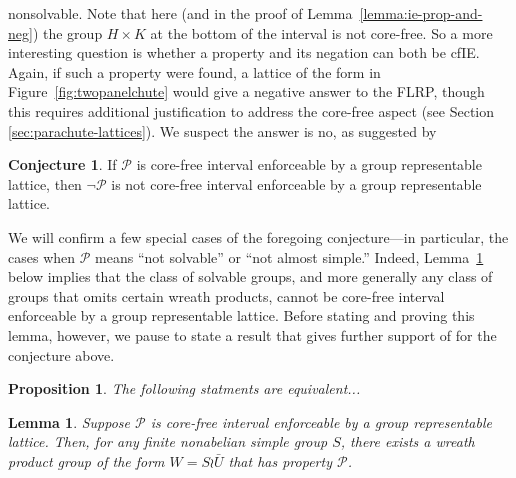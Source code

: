 \documentclass{gen-j-l}
\newcommand{\<}{\ensuremath{\langle}}
\renewcommand{\>}{\ensuremath{\rangle}}
\theoremstyle{plain}
\newtheorem{lemma}[theorem]{Lemma}
\newtheorem{prop}[theorem]{Proposition}
\theoremstyle{definition}
\newcounter{conjecture}
\newtheorem{conjecture}[conjecture]{Conjecture}
\theoremstyle{remark}
\numberwithin{theorem}{section}
\numberwithin{claim}{section}
\numberwithin{equation}{section}
\numberwithin{conjecture}{section}
\newcommand{\2}{\ensuremath{\mathbf{2}}}
\newcommand{\3}{\ensuremath{\mathbf{3}}}
\newcommand{\cP}{\ensuremath{\mathcal{P}}}
\begin{document}
nonsolvable.  Note that here (and in the proof 
of Lemma~\ref{lemma:ie-prop-and-neg}) the group $H\times K$ at the bottom of
the interval is not core-free.  So a more interesting question is whether a
property and its negation can both be \acs{cfIE}.  Again, if such a property were
found, a lattice of the form in Figure~\ref{fig:twopanelchute} would give a
negative answer to the \acs{FLRP}, though this requires additional justification to address
the core-free aspect (see Section \ref{sec:parachute-lattices}).  
We suspect the answer is no, as suggested by
\begin{conjecture}
\label{conjecture:isle-prop2}
If $\cP$ is core-free interval enforceable by a group representable lattice,
then $\neg \cP$ is not core-free interval enforceable by a group representable lattice.
\end{conjecture}

We will confirm a few special cases of the foregoing conjecture---in particular, the cases
when $\cP$ means ``not solvable'' or ``not almost simple.'' Indeed, 
Lemma~\ref{lem:IE-must-have-wreaths} below implies that the class of solvable
groups, and more generally any class of groups that omits certain wreath
products, cannot be core-free interval enforceable by a group representable
lattice. Before stating and proving this lemma, however, we pause to state a
result that gives further support of for the conjecture above.

\begin{prop}
  The following statments are equivalent...
\end{prop}

\begin{lemma}
  \label{lem:IE-must-have-wreaths}
Suppose $\cP$ is core-free interval enforceable by a group
representable lattice.   
Then, for any finite nonabelian simple group $S$, there exists a wreath product group
of the form $W = S\wr \bar{U}$ that has property $\cP$.
\end{lemma}
\end{document}
